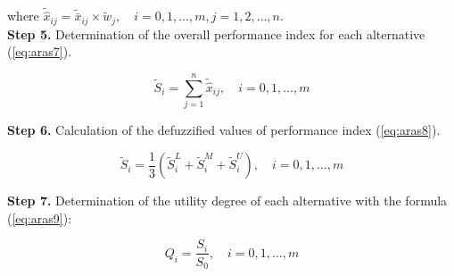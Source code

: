 \noindent where $\widetilde{\widehat{x}}_{i j}=\tilde{\bar{x}}_{i j} \times \widetilde{w}_j, \quad i=0,1, \ldots, m, j=1,2, \ldots, n$. \\

\noindent \textbf{Step 5.} Determination of the overall performance index for each alternative (\ref{eq:aras7}).

\begin{equation}
\widetilde{S}_{i}= \sum_{j=1}^{n} \widetilde{\widehat{x}}_{i j}, \quad i=0, 1, \ldots, m
\label{eq:aras7}
\end{equation}

\noindent \textbf{Step 6.} Calculation of the defuzzified values of performance index (\ref{eq:aras8}).

\begin{equation}
\widetilde{S}_i=\frac{1}{3}\left(\widetilde{S}_{i}^L+\widetilde{S}_{i}^M+\widetilde{S}_{i}^U\right), \quad i=0,1, \ldots, m
\label{eq:aras8}
\end{equation}

\noindent \textbf{Step 7.} Determination of the utility degree of each alternative with the formula (\ref{eq:aras9}):

\begin{equation}
Q_i=\frac{S_i}{S_0}, \quad i=0,1, \ldots, m
\label{eq:aras9}
\end{equation}